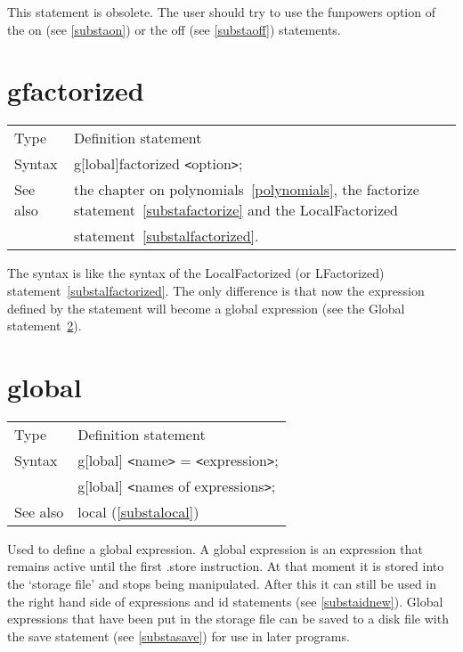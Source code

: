 \noindent This statement is obsolete. The 
user should try to use the funpowers option of the on (see 
\ref{substaon}) or the off (see \ref{substaoff}) statements. 
\vspace{10mm}


\section{gfactorized}
\label{substagfactorized}

\noindent \begin{tabular}{ll}
Type & Definition statement\\
Syntax & g[lobal]factorized {\tt<}option{\tt>};
\\ See also & the chapter on polynomials~\ref{polynomials}, the 
factorize statement~\ref{substafactorize} and the LocalFactorized \\ &
statement~\ref{substalfactorized}.\hfill
\end{tabular}
\smallskip

\noindent The syntax is like the syntax of the LocalFactorized (or 
LFactorized) statement~\ref{substalfactorized}. The only difference is that 
now the expression defined by the statement will become a global 
expression (see the Global statement~\ref{substaglobal}).
\vspace{10mm}


\section{global}
\label{substaglobal}

\noindent \begin{tabular}{ll}
Type & Definition statement\\
Syntax & g[lobal] {\tt<}name{\tt>} = {\tt<}expression{\tt>}; \\
       & g[lobal] {\tt<}names of expressions{\tt>};
\\ See also & local (\ref{substalocal})
\end{tabular} \vspace{4mm}

\noindent Used to define a global 
expression. A global expression is an expression that 
remains active until the first .store instruction. At that 
moment it is stored into the `storage file' and stops being manipulated. After this it can 
still be used in the right hand side of expressions and id 
statements (see \ref{substaidnew}). Global expressions that have been put 
in the storage file can be saved to a disk file with the 
save statement (see \ref{substasave}) for use in later programs.

